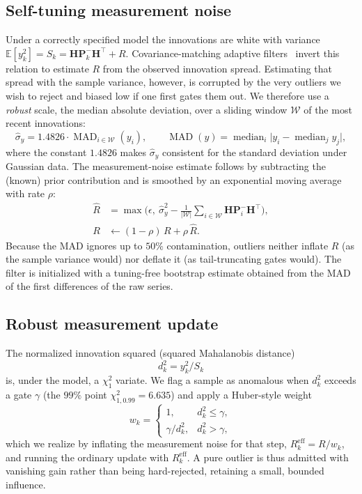 \documentclass[10pt,twocolumn]{article}
\newcommand{\mH}{\mathbf{H}}
\newcommand{\mP}{\mathbf{P}}
\newcommand{\Rmeas}{R}
\newcommand{\mad}{\operatorname{MAD}}
\newcommand{\med}{\operatorname{median}}
\begin{document}
\subsection{Self-tuning measurement noise}
\label{sec:selftune}
Under a correctly specified model the innovations are white with variance
$\mathbb{E}[y_k^2] = S_k = \mH\mP_k^-\mH^\top + \Rmeas$. Covariance-matching
adaptive filters~\cite{mehra1970} invert this relation to estimate $\Rmeas$ from
the observed innovation spread. Estimating that spread with the sample variance,
however, is corrupted by the very outliers we wish to reject and biased low if
one first gates them out. We therefore use a \emph{robust} scale, the median
absolute deviation, over a sliding window $\mathcal{W}$ of the most recent
innovations:
\begin{equation}
\hat\sigma_y = 1.4826 \cdot \mad_{i\in\mathcal{W}}(y_i),\qquad
\mad(y) = \med_i\!\big|y_i - \med_j y_j\big|,
\end{equation}
where the constant $1.4826$ makes $\hat\sigma_y$ consistent for the standard
deviation under Gaussian data. The measurement-noise estimate follows by
subtracting the (known) prior contribution and is smoothed by an exponential
moving average with rate $\rho$:
\begin{align}
\hat\Rmeas &= \max\!\Big(\epsilon,\ \hat\sigma_y^2 - \tfrac{1}{|\mathcal{W}|}\textstyle\sum_{i\in\mathcal{W}} \mH\mP_i^-\mH^\top\Big),\\
\Rmeas &\leftarrow (1-\rho)\,\Rmeas + \rho\,\hat\Rmeas.
\end{align}
Because the MAD ignores up to $50\%$ contamination, outliers neither inflate
$\Rmeas$ (as the sample variance would) nor deflate it (as tail-truncating gates
would). The filter is initialized with a tuning-free bootstrap estimate obtained
from the MAD of the first differences of the raw series.

\subsection{Robust measurement update}
\label{sec:robust}
The normalized innovation squared (squared Mahalanobis distance)
\begin{equation}
d_k^2 = y_k^2 / S_k
\end{equation}
is, under the model, a $\chi^2_1$ variate. We flag a sample as anomalous when
$d_k^2$ exceeds a gate $\gamma$ (the $99\%$ point $\chi^2_{1,0.99}=6.635$) and
apply a Huber-style weight~\cite{huber1964,wang2018}
\begin{equation}
w_k = \begin{cases} 1, & d_k^2 \le \gamma,\\[2pt] \gamma / d_k^2, & d_k^2 > \gamma,\end{cases}
\end{equation}
which we realize by inflating the measurement noise for that step,
$\Rmeas^{\mathrm{eff}}_k = \Rmeas / w_k$, and running the ordinary update with
$\Rmeas^{\mathrm{eff}}_k$. A pure outlier is thus admitted with vanishing gain
rather than being hard-rejected, retaining a small, bounded influence.
\end{document}
